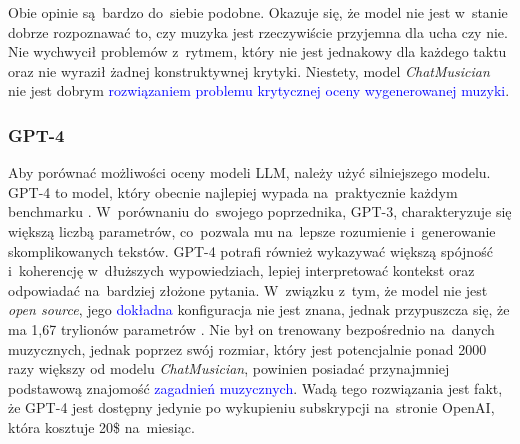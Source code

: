 \documentclass[data-science]{agh-wi} %
\begin{document}
Obie opinie są~bardzo do~siebie podobne. Okazuje się, że model nie jest w~stanie dobrze rozpoznawać to, czy muzyka jest rzeczywiście przyjemna dla ucha czy nie. Nie wychwycił problemów z~rytmem, który nie jest jednakowy dla każdego taktu oraz nie wyraził żadnej konstruktywnej krytyki. Niestety, model \textit{ChatMusician} nie jest dobrym \textcolor{blue}{rozwiązaniem problemu krytycznej oceny wygenerowanej muzyki}.

\subsubsection*{GPT-4}
Aby porównać możliwości oceny modeli LLM, należy użyć silniejszego modelu. GPT-4 to model, który obecnie najlepiej wypada na~praktycznie każdym benchmarku \cite{openai2024gpt4}. W~porównaniu do~swojego poprzednika, GPT-3, charakteryzuje się większą liczbą parametrów, co~pozwala mu na~lepsze rozumienie i~generowanie skomplikowanych tekstów. GPT-4 potrafi również wykazywać większą spójność i~koherencję w~dłuższych wypowiedziach, lepiej interpretować kontekst oraz odpowiadać na~bardziej złożone pytania. W~związku z~tym, że model nie jest \textit{open source}, jego \textcolor{blue}{dokładna} konfiguracja nie jest znana, jednak przypuszcza się, że ma 1,67 trylionów parametrów \cite{leakgpt4}. Nie był on trenowany bezpośrednio na~danych muzycznych, jednak poprzez swój rozmiar, który jest potencjalnie ponad 2000 razy większy od modelu \textit{ChatMusician}, powinien posiadać przynajmniej podstawową znajomość \textcolor{blue}{zagadnień muzycznych}. Wadą tego rozwiązania jest fakt, że GPT-4 jest dostępny jedynie po wykupieniu subskrypcji na~stronie OpenAI, która kosztuje 20\$ na~miesiąc.
\end{document}

